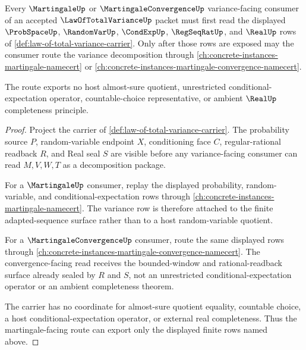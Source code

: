 \begin{theorem}
\label{thm:law-of-total-variance-martingale-variance-consumer-route}
Every $\MartingaleUp$ or $\MartingaleConvergenceUp$ variance-facing consumer of an accepted $\LawOfTotalVarianceUp$ packet must first read the displayed $\ProbSpaceUp$, $\RandomVarUp$, $\CondExpUp$, $\RegSeqRatUp$, and $\RealUp$ rows of \autoref{def:law-of-total-variance-carrier}. Only after those rows are exposed may the consumer route the variance decomposition through \autoref{ch:concrete-instances-martingale-namecert} or \autoref{ch:concrete-instances-martingale-convergence-namecert}.

The route exports no host almost-sure quotient, unrestricted conditional-expectation operator, countable-choice representative, or ambient $\RealUp$ completeness principle.
\end{theorem}
\begin{proof}
Project the carrier of \autoref{def:law-of-total-variance-carrier}. The probability source $P$, random-variable endpoint $X$, conditioning face $C$, regular-rational readback $R$, and Real seal $S$ are visible before any variance-facing consumer can read $M,V,W,T$ as a decomposition package.

For a $\MartingaleUp$ consumer, replay the displayed probability, random-variable, and conditional-expectation rows through \autoref{ch:concrete-instances-martingale-namecert}. The variance row is therefore attached to the finite adapted-sequence surface rather than to a host random-variable quotient.

For a $\MartingaleConvergenceUp$ consumer, route the same displayed rows through \autoref{ch:concrete-instances-martingale-convergence-namecert}. The convergence-facing read receives the bounded-window and rational-readback surface already sealed by $R$ and $S$, not an unrestricted conditional-expectation operator or an ambient completeness theorem.

The carrier has no coordinate for almost-sure quotient equality, countable choice, a host conditional-expectation operator, or external real completeness. Thus the martingale-facing route can export only the displayed finite rows named above.
\end{proof}
